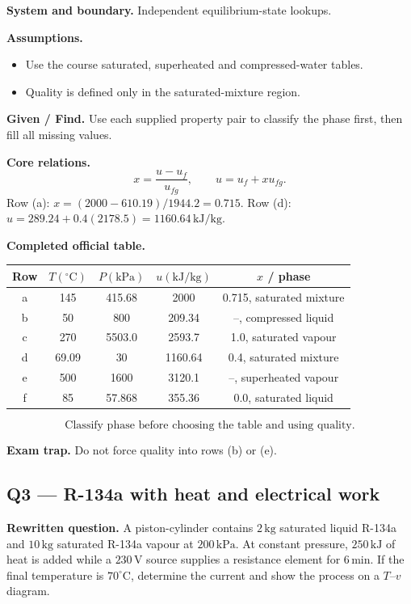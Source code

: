\textbf{System and boundary.} Independent equilibrium-state lookups.

\textbf{Assumptions.}
\begin{itemize}
  \item Use the course saturated, superheated and compressed-water tables.
  \item Quality is defined only in the saturated-mixture region.
\end{itemize}

\textbf{Given / Find.} Use each supplied property pair to classify the phase first, then fill all missing values.

\textbf{Core relations.}
\[
x=\frac{u-u_f}{u_{fg}},\qquad u=u_f+xu_{fg}.
\]
Row (a): $x=(2000-610.19)/1944.2=0.715$. Row (d): $u=289.24+0.4(2178.5)=1160.64\,\mathrm{kJ/kg}$.

\textbf{Completed official table.}
\begin{center}
\small
\begin{tabular}{ccccc}
\toprule
Row & $T(^\circ\mathrm{C})$ & $P(\mathrm{kPa})$ & $u(\mathrm{kJ/kg})$ & $x$ / phase\\
\midrule
a & 145 & 415.68 & 2000 & 0.715, saturated mixture\\
b & 50 & 800 & 209.34 & --, compressed liquid\\
c & 270 & 5503.0 & 2593.7 & 1.0, saturated vapour\\
d & 69.09 & 30 & 1160.64 & 0.4, saturated mixture\\
e & 500 & 1600 & 3120.1 & --, superheated vapour\\
f & 85 & 57.868 & 355.36 & 0.0, saturated liquid\\
\bottomrule
\end{tabular}
\end{center}
\[
\boxed{\text{Classify phase before choosing the table and using quality.}}
\]

\textbf{Exam trap.} Do not force quality into rows (b) or (e).

\subsection*{Q3 --- R-134a with heat and electrical work}
\textbf{Rewritten question.} A piston-cylinder contains $2\,\mathrm{kg}$ saturated liquid R-134a and $10\,\mathrm{kg}$ saturated R-134a vapour at $200\,\mathrm{kPa}$. At constant pressure, $250\,\mathrm{kJ}$ of heat is added while a $230\,\mathrm{V}$ source supplies a resistance element for $6\,\mathrm{min}$. If the final temperature is $70^\circ\mathrm{C}$, determine the current and show the process on a $T$--$v$ diagram.

